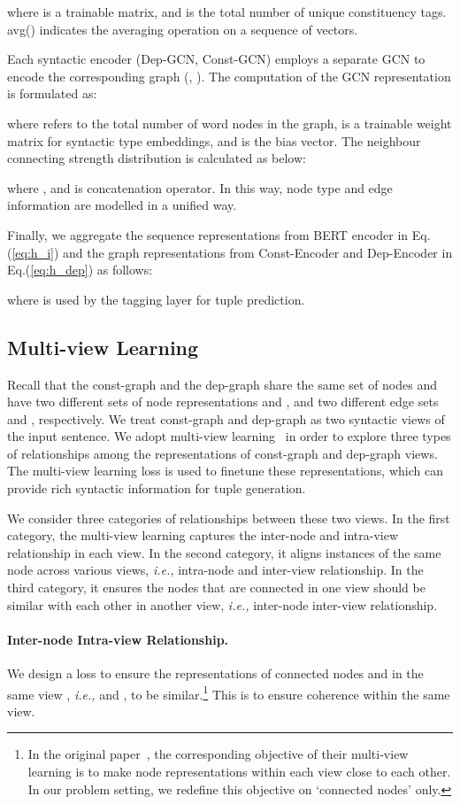 \documentclass[11pt]{article}
\newcommand{\ie}{\emph{i.e.,}\xspace}
\begin{document}
where  is a trainable matrix, and  is the total number of unique constituency tags. avg() indicates the averaging operation on a sequence of vectors. 


Each syntactic encoder (Dep-GCN, Const-GCN) employs a separate GCN to encode the corresponding graph (, ). The computation of the GCN representation is formulated as:

where  refers to the total number of word nodes in the graph,  is a trainable weight matrix for syntactic type embeddings, and  is the bias vector. The neighbour connecting strength distribution  is calculated as below:

where , and  is concatenation operator.
In this way, node type and edge information are modelled in a unified way.


Finally, we aggregate the sequence representations from BERT encoder in Eq.(\ref{eq:h_i}) and the graph representations from Const-Encoder and Dep-Encoder in Eq.(\ref{eq:h_dep}) as follows:

where  is used by the tagging layer for tuple prediction.


\subsection{Multi-view Learning}


Recall that the const-graph and the dep-graph share the same set of nodes  and have two different sets of node representations  and , and two different edge sets  and , respectively. We treat const-graph and dep-graph as two syntactic views  of the input sentence.
We adopt multi-view learning~\cite{mane_multi_view_2021} in order to explore three types of relationships among the representations of const-graph and dep-graph views. The multi-view learning loss is used to finetune these representations, which can provide rich syntactic information for tuple generation.

We consider three categories of relationships between these two views. In the first category, the multi-view learning captures the inter-node and intra-view relationship in each view. In the second category, it aligns instances of the same node across various views, \ie intra-node and inter-view relationship. In the third category, it ensures the nodes that are connected in one view should be similar with each other in another view, \ie inter-node inter-view relationship.


\paragraph{Inter-node Intra-view Relationship.}
We design a loss to ensure the representations of connected nodes  and  in the same view , \ie  and , to be similar.\footnote{In the original paper~\cite{mane_multi_view_2021}, the corresponding objective of their multi-view learning is to make node representations within each view close to each other. In our problem setting, we redefine this objective on `connected nodes' only.} This is to ensure coherence within the same view.
\end{document}

